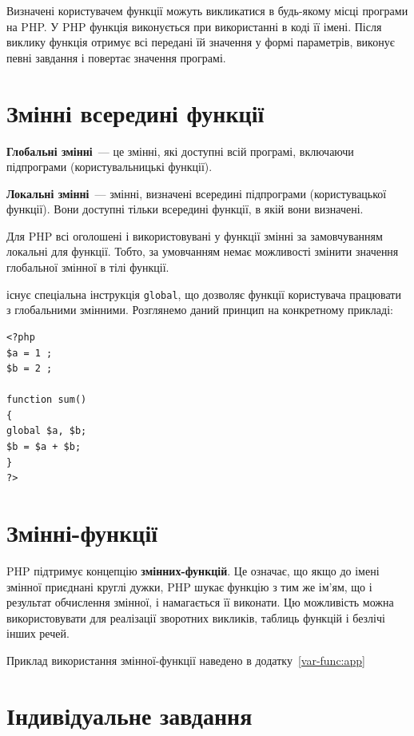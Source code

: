 Визначені користувачем функції можуть викликатися в будь-якому місці програми на PHP. У PHP функція виконується при використанні в коді її імені. Після виклику функція отримує всі передані їй значення у формі параметрів, виконує певні завдання і повертає значення програмі. 

\pagebreak[3]
\section{Змінні всередині функції}
\nopagebreak[4]
\textbf{Глобальні змінні}~--- це змінні, які доступні всій програмі, включаючи підпрограми (користувальницькі функції).

\textbf{Локальні змінні}~--- змінні, визначені всередині підпрограми (користувацької функції). Вони доступні тільки всередині функції, в якій вони визначені.

Для PHP всі оголошені і використовувані у функції змінні за замовчуванням локальні для функції. Тобто, за умовчанням немає можливості змінити значення глобальної змінної в тілі функції. 

існує спеціальна інструкція \verb'global', що дозволяє функції користувача працювати з глобальними змінними. Розглянемо даний принцип на конкретному прикладі:

\begin{verbatim}
<?php
$a = 1 ;
$b = 2 ;

function sum()
{
global $a, $b;
$b = $a + $b;
}
?> 
\end{verbatim}

\pagebreak[3]
\section{Змінні-функції}
\nopagebreak[4]
PHP підтримує концепцію \textbf{змінних-функцій}. Це означає, що якщо до імені змінної приєднані круглі дужки, PHP шукає функцію з тим же ім'ям, що і результат обчислення змінної, і намагається її виконати. Цю можливість можна використовувати для реалізації зворотних викликів, таблиць функцій і безлічі інших речей.

Приклад використання змінної-функції наведено в додатку~\ref{var-func:app}

\pagebreak[3]
\section{Індивідуальне завдання}

